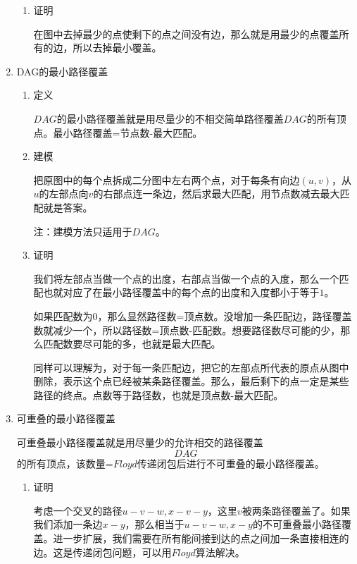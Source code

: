\documentclass[11pt]{article}
\begin{document}
\begin{enumerate}
\begin{enumerate}
\item 证明
\label{sec-2-4-4-3-2}

在图中去掉最少的点使剩下的点之间没有边，那么就是用最少的点覆盖所有的边，所以去掉最小覆盖。
\end{enumerate}

\item DAG的最小路径覆盖
\label{sec-2-4-4-4}

\begin{enumerate}
\item 定义
\label{sec-2-4-4-4-1}

\(DAG\)的最小路径覆盖就是用尽量少的不相交简单路径覆盖\(DAG\)的所有顶点。最小路径覆盖=节点数-最大匹配。

\item 建模
\label{sec-2-4-4-4-2}

把原图中的每个点拆成二分图中左右两个点，对于每条有向边\((u,v)\)，从\(u\)的左部点向\(v\)的右部点连一条边，然后求最大匹配，用节点数减去最大匹配就是答案。

注：建模方法只适用于\(DAG\)。

\item 证明
\label{sec-2-4-4-4-3}

我们将左部点当做一个点的出度，右部点当做一个点的入度，那么一个匹配也就对应了在最小路径覆盖中的每个点的出度和入度都小于等于\(1\)。

如果匹配数为\(0\)，那么显然路径数=顶点数。没增加一条匹配边，路径覆盖数就减少一个，所以路径数=顶点数-匹配数。想要路径数尽可能的少，那么匹配数要尽可能的多，也就是最大匹配。

同样可以理解为，对于每一条匹配边，把它的左部点所代表的原点从图中删除，表示这个点已经被某条路径覆盖。那么，最后剩下的点一定是某些路径的终点。点数等于路径数，也就是顶点数-最大匹配。
\end{enumerate}

\item 可重叠的最小路径覆盖
\label{sec-2-4-4-5}

可重叠最小路径覆盖就是用尽量少的允许相交的路径覆盖$$DAG$$的所有顶点，该数量=\(Floyd\)传递闭包后进行不可重叠的最小路径覆盖。

\begin{enumerate}
\item 证明
\label{sec-2-4-4-5-1}

考虑一个交叉的路径\(u-v-w,x-v-y\)，这里\(v\)被两条路径覆盖了。如果我们添加一条边\(x-y\)，那么相当于\(u-v-w,x-y\)的不可重叠最小路径覆盖。进一步扩展，我们需要在所有能间接到达的点之间加一条直接相连的边。这是传递闭包问题，可以用\(Floyd\)算法解决。
\end{enumerate}
\end{enumerate}
\end{document}
